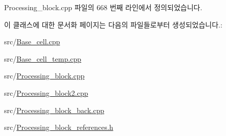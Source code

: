 Processing\+\_\+block.\+cpp 파일의 668 번째 라인에서 정의되었습니다.



이 클래스에 대한 문서화 페이지는 다음의 파일들로부터 생성되었습니다.\+:\begin{DoxyCompactItemize}
\item 
src/\hyperlink{Base__cell_8cpp}{Base\+\_\+cell.\+cpp}\item 
src/\hyperlink{Base__cell__temp_8cpp}{Base\+\_\+cell\+\_\+temp.\+cpp}\item 
src/\hyperlink{Processing__block_8cpp}{Processing\+\_\+block.\+cpp}\item 
src/\hyperlink{Processing__block2_8cpp}{Processing\+\_\+block2.\+cpp}\item 
src/\hyperlink{Processing__block__back_8cpp}{Processing\+\_\+block\+\_\+back.\+cpp}\item 
src/\hyperlink{Processing__block__references_8h}{Processing\+\_\+block\+\_\+references.\+h}\end{DoxyCompactItemize}
